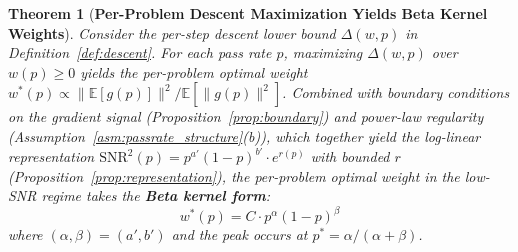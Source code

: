 \documentclass{article}
\newtheorem{theorem}{Theorem}
\begin{document}
\begin{theorem}[\textbf{Per-Problem Descent Maximization Yields Beta Kernel Weights}]
\label{thm:beta_optimal}
Consider the per-step descent lower bound $\Delta(w,p)$ in Definition~\ref{def:descent}. For each pass rate $p$, maximizing $\Delta(w, p)$ over $w(p) \geq 0$ yields the per-problem optimal weight $w^*(p) \propto \|\mathbb{E}[g(p)]\|^2 / \mathbb{E}[\|g(p)\|^2]$.
Combined with boundary conditions on the gradient signal (Proposition~\ref{prop:boundary}) and power-law regularity (Assumption~\ref{asm:passrate_structure}(b)), which together yield the log-linear representation $\text{SNR}^2(p) = p^{a'}(1-p)^{b'} \cdot e^{r(p)}$ with bounded $r$ (Proposition~\ref{prop:representation}), the per-problem optimal weight in the low-SNR regime takes the \textbf{Beta kernel form}:
\begin{equation}
  w^*(p) = C \cdot p^{\alpha}(1-p)^{\beta}
\end{equation}
where $(\alpha, \beta) = (a', b')$ and the peak occurs at $p^* = \alpha/(\alpha + \beta)$.
\end{theorem}
\end{document}
